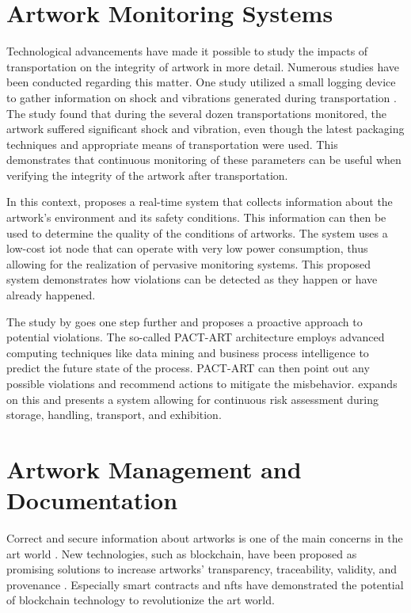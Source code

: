 \section{Artwork Monitoring Systems}
Technological advancements have made it possible to study the impacts of transportation on the integrity of artwork in more detail. Numerous studies have been conducted regarding this matter. One study utilized a small logging device to gather information on shock and vibrations generated during transportation \cite{shockvibrationtransit}. The study found that during the several dozen transportations monitored, the artwork suffered significant shock and vibration, even though the latest packaging techniques and appropriate means of transportation were used. This demonstrates that continuous monitoring of these parameters can be useful when verifying the integrity of the artwork after transportation.

In this context, \cite{woodenartworkmonitoring} proposes a real-time system that collects information about the artwork's environment and its safety conditions. This information can then be used to determine the quality of the conditions of artworks. The system uses a low-cost \gls{iot} node that can operate with very low power consumption, thus allowing for the realization of pervasive monitoring systems. This proposed system demonstrates how violations can be detected as they happen or have already happened. 

The study by \cite{pactart} goes one step further and proposes a proactive approach to potential violations. The so-called PACT-ART architecture employs advanced computing techniques like data mining and business process intelligence to predict the future state of the process. PACT-ART can then point out any possible violations and recommend actions to mitigate the misbehavior. \cite{riskmonitoring} expands on this and presents a system allowing for continuous risk assessment during storage, handling, transport, and exhibition.

\section{Artwork Management and Documentation}
Correct and secure information about artworks is one of the main concerns in the art world \cite{bcartmarket}. New technologies, such as blockchain, have been proposed as promising solutions to increase artworks' transparency, traceability, validity, and provenance \cite{cyberartmarket}. Especially smart contracts and \glspl{nft} have demonstrated the potential of blockchain technology to revolutionize the art world. 

